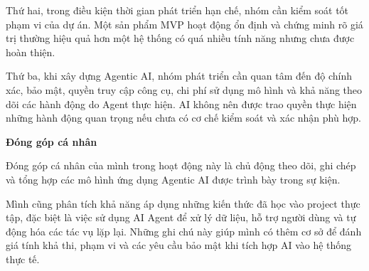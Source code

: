 Thứ hai, trong điều kiện thời gian phát triển hạn chế, nhóm cần kiểm
soát tốt phạm vi của dự án. Một sản phẩm MVP hoạt động ổn định và chứng
minh rõ giá trị thường hiệu quả hơn một hệ thống có quá nhiều tính năng
nhưng chưa được hoàn thiện.

Thứ ba, khi xây dựng Agentic AI, nhóm phát triển cần quan tâm đến độ
chính xác, bảo mật, quyền truy cập công cụ, chi phí sử dụng mô hình và
khả năng theo dõi các hành động do Agent thực hiện. AI không nên được
trao quyền thực hiện những hành động quan trọng nếu chưa có cơ chế kiểm
soát và xác nhận phù hợp.

\vspace{0.5em}\noindent\textbf{Đóng góp cá nhân}\par

Đóng góp cá nhân của mình trong hoạt động này là chủ động theo dõi, ghi
chép và tổng hợp các mô hình ứng dụng Agentic AI được trình bày trong sự
kiện.

Mình cũng phân tích khả năng áp dụng những kiến thức đã học vào project
thực tập, đặc biệt là việc sử dụng AI Agent để xử lý dữ liệu, hỗ trợ
người dùng và tự động hóa các tác vụ lặp lại. Những ghi chú này giúp
mình có thêm cơ sở để đánh giá tính khả thi, phạm vi và các yêu cầu bảo
mật khi tích hợp AI vào hệ thống thực tế.
